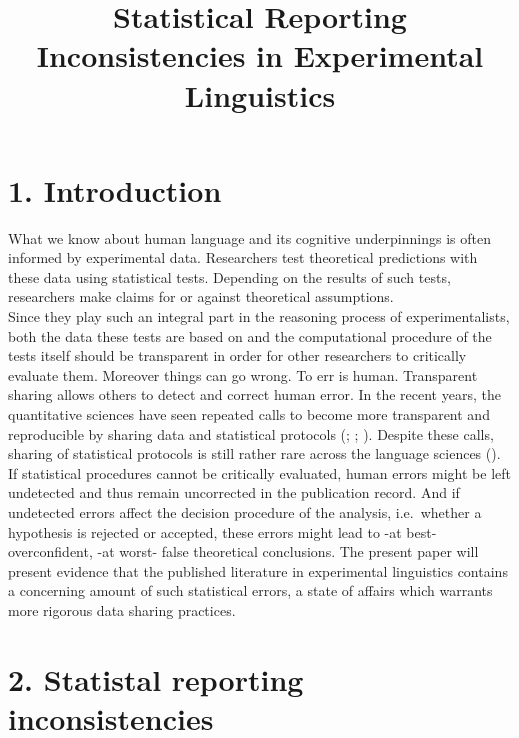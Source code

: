 \documentclass[
  doc,
  longtable,
  nolmodern,
  notxfonts,
  notimes,
  colorlinks=true,linkcolor=blue,citecolor=blue,urlcolor=blue]{apa7}
\title{Statistical Reporting Inconsistencies in Experimental
Linguistics}
\affiliation{
{Department of Linguistics \& Scandinavian Studies, University of Oslo}}
\begin{document}
\maketitle


\setcounter{secnumdepth}{-\maxdimen} %

\setlength\LTleft{0pt}


\section{1. Introduction}\label{introduction}

What we know about human language and its cognitive underpinnings is
often informed by experimental data. Researchers test theoretical
predictions with these data using statistical tests. Depending on the
results of such tests, researchers make claims for or against
theoretical assumptions.\\
Since they play such an integral part in the reasoning process of
experimentalists, both the data these tests are based on and the
computational procedure of the tests itself should be transparent in
order for other researchers to critically evaluate them. Moreover things
can go wrong. To err is human. Transparent sharing allows others to
detect and correct human error. In the recent years, the quantitative
sciences have seen repeated calls to become more transparent and
reproducible by sharing data and statistical protocols
(;
;
). Despite these
calls, sharing of statistical protocols is still rather rare across the
language sciences (). If statistical procedures cannot be critically evaluated,
human errors might be left undetected and thus remain uncorrected in the
publication record. And if undetected errors affect the decision
procedure of the analysis, i.e.~whether a hypothesis is rejected or
accepted, these errors might lead to -at best- overconfident, -at worst-
false theoretical conclusions. The present paper will present evidence
that the published literature in experimental linguistics contains a
concerning amount of such statistical errors, a state of affairs which
warrants more rigorous data sharing practices.

\section{2. Statistal reporting
inconsistencies}\label{statistal-reporting-inconsistencies}
\end{document}
